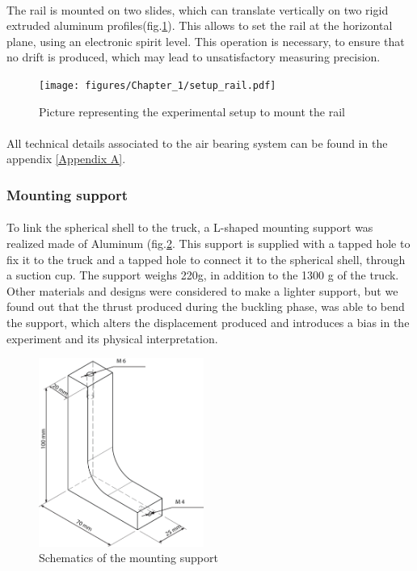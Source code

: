 \paragraph{}
The rail is mounted on two slides, which can translate vertically on two rigid extruded aluminum profiles(fig.\ref{fig:setup_rail}). This allows to set the rail at the horizontal plane, using an electronic spirit level. This operation is necessary, to ensure that no drift is produced, which may lead to unsatisfactory measuring precision.
\begin{figure}[H] %
	\centering%
	\texttt{[image: figures/Chapter\_1/setup\_rail.pdf]}
	\caption{Picture representing the experimental setup to mount the rail}
	\label{fig:setup_rail}
\end{figure}

\paragraph{}
All technical details associated to the air bearing system can be found in the appendix \ref{Appendix A}.
\subsubsection{Mounting support}
\paragraph{}
To link the spherical shell to the truck, a L-shaped mounting support was realized made of Aluminum (fig.\ref{fig:mounting_support}. This support is supplied with a tapped hole to fix it to the truck and a tapped hole to connect it to the spherical shell, through a suction cup. The support weighs 220g, in addition to the 1300 g of the truck. Other materials and designs were considered to make a lighter support, but we found out that the thrust produced during the buckling phase, was able to bend the support, which alters the displacement produced and introduces a bias in the experiment and its physical interpretation.
\begin{figure}[H] %
	\centering%
	\includegraphics[width=0.48\textwidth]{figures/Chapter_1/Support.png}
	\caption{Schematics of the mounting support}
	\label{fig:mounting_support}
\end{figure}


